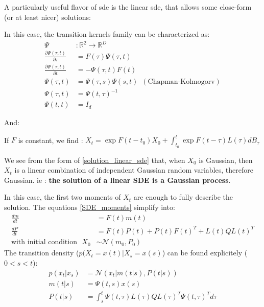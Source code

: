 A particularly useful flavor of \gls{sde} is the linear \gls{sde}, that allows some close-form (or at least nicer) solutions:


In this case, the transition kernels family can be characterized as:
\begin{align}
    \Psi &: \mathbb{R}^{2 } \rightarrow \mathbb{R}^{D} \\
    \frac{\partial \Psi (\tau, t)}{\partial \tau} &= F(\tau) \Psi(\tau, t) \\
    \frac{\partial \Psi (\tau, t)}{\partial t} &= - \Psi(\tau, t) F(t)  \\
    \Psi(\tau, t) &= \Psi(\tau, s) \Psi(s, t) \,\,\, (\text{Chapman-Kolmogorv}) \\
    \Psi(\tau, t) &= \Psi(t, \tau)^{-1} \\ 
    \Psi(t,t) &= I_d
\end{align}

And:

If $F$ is constant, we find : $X_t = \exp{F(t-t_0)}X_0 + \int_{t_0}^{t} \exp{F(t- \tau)}L(\tau)dB_{\tau}$

We see from the form of \ref{solution_linear_sde} that, when $X_0$ is Gaussian, then $X_t$ is a linear combination of 
independent Gaussian random variables, therefore Gaussian. ie : \textbf{the solution of a linear SDE is a Gaussian process}.

In this case, the first two moments of $X_t$ are enough to fully describe the solution. The equations \ref{SDE_moments} simplify into:
\begin{align}
    \label{SDE_linear_moments}
    \frac{dm}{dt} &= F(t) m(t) \\
    \frac{dP}{dt} &= F(t)P(t) + P(t)F(t)^{T} + L(t)QL(t)^{T} \\
    \text{with initial condition } \,\, X_0 &\sim \mathcal{N}(m_0, P_0)
\end{align}
The transition density ($p(X_t = x(t) \vert X_s = x(s)$) can be found explicitely ($0 < s < t$):
\begin{align}
    p(x_t \vert x_s) &= \mathcal{N}(x_t \vert m(t\vert s), P(t \vert s)) \\
    m(t \vert s) &= \Psi(t,s)x(s) \\
    P(t \vert s) &= \int_{s}^{t} \Psi(t,\tau)L(\tau)Q L(\tau)^{T}\Psi(t, \tau)^{T} d\tau
\end{align}


